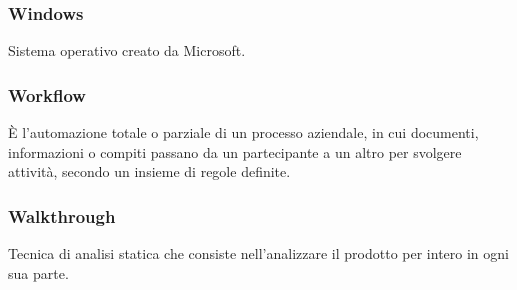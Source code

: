\subsubsection*{Windows} Sistema operativo creato da Microsoft.
\subsubsection*{Workflow} È l’automazione totale o parziale di un processo aziendale, in cui documenti, informazioni o compiti passano da un partecipante a un altro per svolgere attività, secondo un insieme di regole definite.
\subsubsection*{Walkthrough} Tecnica di analisi statica che consiste nell’analizzare il prodotto per intero in ogni sua parte.

